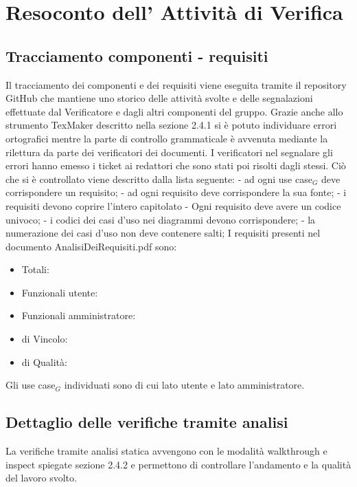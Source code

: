 \section{Resoconto dell' Attività di Verifica}

\subsection{Tracciamento componenti - requisiti}
Il tracciamento dei componenti e dei requisiti viene eseguita tramite il repository GitHub che mantiene uno storico delle attività svolte e delle segnalazioni effettuate dal Verificatore e dagli altri componenti del gruppo.
Grazie anche allo strumento TexMaker descritto nella sezione 2.4.1 si è potuto individuare errori ortografici mentre la parte di controllo grammaticale è avvenuta mediante la rilettura da parte dei verificatori dei documenti. I verificatori nel segnalare gli errori hanno emesso i ticket ai redattori che sono stati poi risolti dagli stessi.
Ciò che si è controllato viene descritto dalla lista seguente:
- ad ogni use case$_G$ deve corrispondere un requisito;
- ad ogni requisito deve corrispondere la sua fonte;
- i requisiti devono coprire l'intero capitolato
- Ogni requisito deve avere un codice univoco;
- i codici dei casi d'uso nei diagrammi devono corrispondere;
- la numerazione dei casi d'uso non deve contenere salti;
I requisiti presenti nel documento AnalisiDeiRequisiti.pdf sono:
\begin{itemize}
\item Totali: 
\item Funzionali utente:
\item Funzionali amministratore:
\item di Vincolo:
\item di Qualità:
\end{itemize}
Gli use case$_G$ individuati sono di cui lato utente e lato  amministratore.
\subsection{Dettaglio delle verifiche tramite analisi}
La verifiche tramite analisi statica avvengono con le modalità walkthrough e inspect spiegate sezione 2.4.2 e permettono di controllare l'andamento e la qualità del lavoro svolto.

